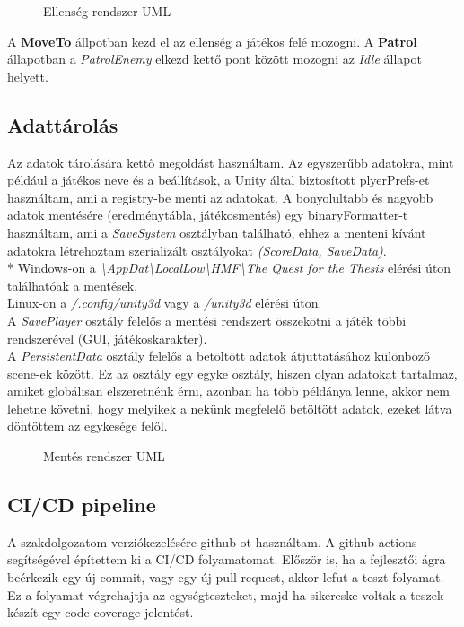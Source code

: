 \begin{figure}[H]
	\noindent{}
	\caption{Ellenség rendszer UML}
	\label{EnemySystem}
\end{figure}

A \textbf{MoveTo} állpotban kezd el az ellenség a játékos felé mozogni. A \textbf{Patrol} állapotban a \textit{PatrolEnemy} elkezd kettő pont között mozogni az \textit{Idle} állapot helyett.

\subsection{Adattárolás}
Az adatok tárolására kettő megoldást használtam. Az egyszerűbb adatokra, mint például a játékos neve és a beállítások, a Unity által biztosított plyerPrefs-et használtam, ami a registry-be menti az adatokat. A bonyolultabb és nagyobb adatok mentésére (eredménytábla, játékosmentés) egy binaryFormatter-t használtam, ami a \textit{SaveSystem} osztályban található, ehhez a menteni kívánt adatokra létrehoztam szerializált osztályokat \textit{(ScoreData, SaveData)}.\\*
Windows-on a \textit{\textbackslash AppDat\textbackslash LocalLow\textbackslash HMF\textbackslash The Quest for the Thesis} elérési úton találhatóak a mentések,\\
Linux-on a \textit{/.config/unity3d} vagy a \textit{/unity3d} elérési úton.\\
A \textit{SavePlayer} osztály felelős a mentési rendszert összekötni a játék többi rendszerével (GUI, játékoskarakter).\\
A \textit{PersistentData} osztály felelős a betöltött adatok átjuttatásához különböző scene-ek között. Ez az osztály egy egyke osztály, hiszen olyan adatokat tartalmaz, amiket globálisan elszeretnénk érni, azonban ha több példánya lenne, akkor nem lehetne követni, hogy melyikek a nekünk megfelelő betöltött adatok, ezeket látva döntöttem az egykesége felől.

\begin{figure}[H]
	\noindent{}
	\caption{Mentés rendszer UML}
	\label{SaveSystem}
\end{figure}

\cleardoublepage
\subsection{CI/CD pipeline}
A szakdolgozatom verziókezelésére github-ot használtam. A github actions segítségével építettem ki a CI/CD folyamatomat. Először is, ha a fejlesztői ágra beérkezik egy új commit, vagy egy új pull request, akkor lefut a teszt folyamat. Ez a folyamat végrehajtja az egységteszteket, majd ha sikereske voltak a teszek készít egy code coverage jelentést.


